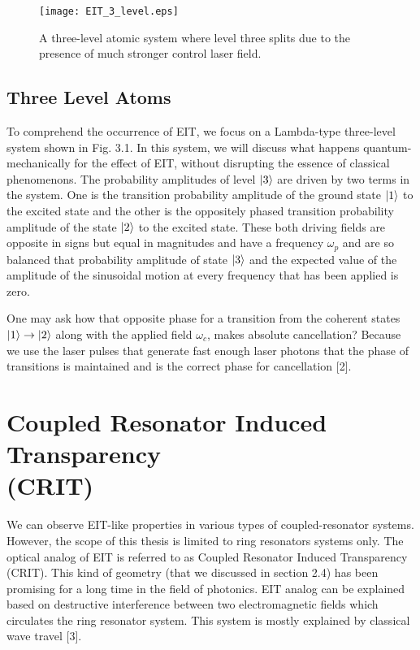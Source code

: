 \begin{figure}[h]
\centering
\texttt{[image: EIT\_3\_level.eps]}
\caption{A three-level atomic system where level three splits due to the presence of much stronger control laser field.}
\end{figure}

\subsection{Three Level Atoms}
To comprehend the occurrence of EIT, we focus on a Lambda-type three-level system shown in Fig. 3.1. In this system, we will discuss what happens quantum-mechanically for the effect of EIT, without disrupting the essence of classical phenomenons. The probability amplitudes of level $\ket{3}$ are driven by two terms in the system. One is the transition probability amplitude of the ground state $\ket{1}$ to the excited state and the other is the oppositely phased transition probability amplitude of the state $\ket{2}$ to the excited state. These both driving fields are opposite in signs but equal in magnitudes and have a frequency $\omega_{p}$ and are so balanced that probability amplitude of state $\ket{3}$ and the expected value of the amplitude of the sinusoidal motion at every frequency that has been applied is zero. 


One may ask how that opposite phase for a transition from the coherent states $\ket{1} \to \ket{2}$ along with the applied field $\omega_{c}$, makes absolute cancellation? Because we use the laser pulses that generate fast enough laser photons that the phase of transitions is maintained and is the correct phase for cancellation [2]. 

 
\section{Coupled Resonator Induced Transparency \\ (CRIT)}
We can observe EIT-like properties in various types of coupled-resonator systems. However, the scope of this thesis is limited to ring resonators systems only. The optical analog of EIT is referred to as Coupled Resonator Induced Transparency (CRIT). This kind of geometry (that we discussed in section 2.4) has been promising for a long time in the field of photonics. EIT analog can be explained based on destructive interference between two electromagnetic fields which circulates the ring resonator system. This system is mostly explained by classical wave travel [3].

